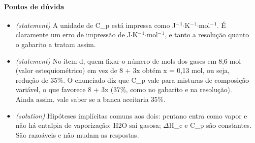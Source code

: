 \documentclass{article}%
\begin{document}
\paragraph{Pontos de dúvida}%
\begin{itemize}%
\item%
\textit{(statement)} A unidade de C\_p está impressa como J$^{-}$$^{1}$$\cdot$K$^{-}$$^{1}$$\cdot$mol$^{-}$$^{1}$. É claramente um erro de impressão de J$\cdot$K$^{-}$$^{1}$$\cdot$mol$^{-}$$^{1}$, e tanto a resolução quanto o gabarito a tratam assim.%
\item%
\textit{(statement)} No item d, quem fixar o número de mols dos gases em 8,6 mol (valor estequiométrico) em vez de 8 + 3x obtém x = 0,13 mol, ou seja, redução de 35\%. O enunciado diz que C\_p vale para misturas de composição variável, o que favorece 8 + 3x (37\%, como no gabarito e na resolução). Ainda assim, vale saber se a banca aceitaria 35\%.%
\item%
\textit{(solution)} Hipóteses implícitas comuns aos dois: pentano entra como vapor e não há entalpia de vaporização; H2O sai gasosa; $\Delta$H\_c e C\_p são constantes. São razoáveis e não mudam as respostas.%
\end{itemize}%
\end{document}
